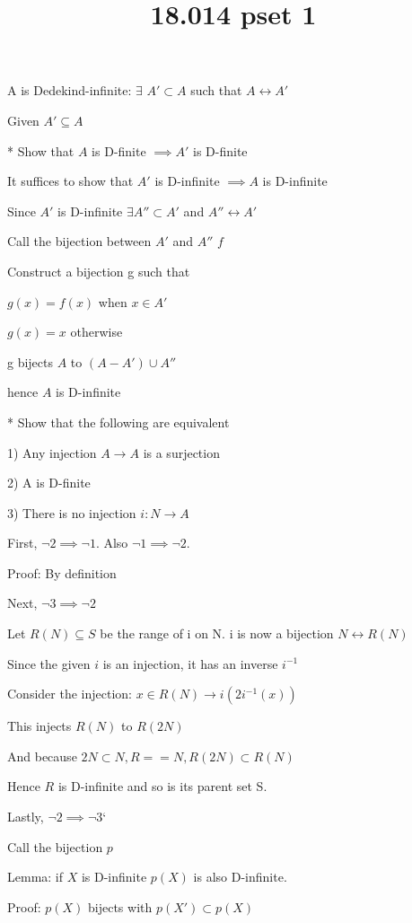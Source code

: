 \documentclass{article}
\title{18.014 pset 1}
\date{}
\begin{document}
\maketitle

A is Dedekind-infinite: $\exists$ $A' \subset A$ such that $A \leftrightarrow A'$


Given $A' \subseteq A$

* Show that $A$ is D-finite $\implies A'$ is D-finite

It suffices to show that $A'$ is D-infinite $\implies A$ is D-infinite

Since $A'$ is D-infinite $\exists A'' \subset A'$ and $A'' \leftrightarrow A'$

Call the bijection between $A'$ and $A''$ $f$

Construct a bijection g such that

$g(x) = f(x)$ when $x \in A'$

$g(x) = x$ otherwise

g bijects $A$ to $(A - A') \cup A'' $

hence $A$ is D-infinite

* Show that the following are equivalent

1) Any injection $A \rightarrow A$ is a surjection

2) A is D-finite

3) There is no injection $i: N \rightarrow A$

First, $\lnot 2 \implies \lnot 1$. Also $\lnot 1 \implies \lnot 2$. 

Proof: By definition

Next, $\lnot 3 \implies \lnot 2$

Let $R(N) \subseteq S$ be the range of i on N. i is now a bijection $N \leftrightarrow R(N)$

Since the given $i$ is an injection, it has an inverse $i^{-1}$

Consider the injection: $x \in R(N) \rightarrow i(2 i^{-1}(x))$

This injects $R(N)$ to $R(2N)$

And because $2N \subset N, R == N, R(2N) \subset R(N)$

Hence $R$ is D-infinite and so is its parent set S.

Lastly, $\lnot 2 \implies \lnot 3$`

Call the bijection $p$

Lemma: if $X$ is D-infinite $p(X)$ is also D-infinite.

Proof: $p(X)$ bijects with $p(X') \subset p(X)$
\end{document}
